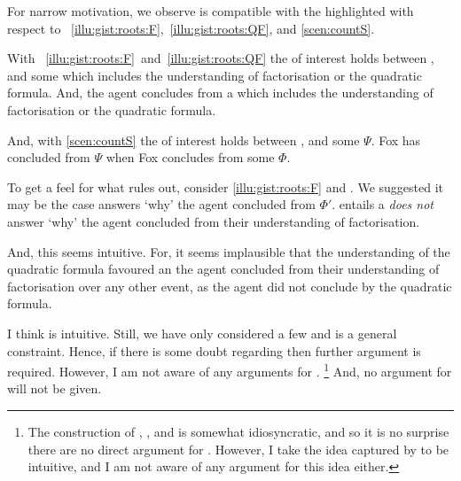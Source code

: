 \begin{note}
  For narrow motivation, we observe \issueInclusion{} is compatible with the  highlighted with respect to ~\ref{illu:gist:roots:F},~\ref{illu:gist:roots:QF}, and \ref{scen:countS}.

  With ~\ref{illu:gist:roots:F}~and~\ref{illu:gist:roots:QF} the \fofr{} of interest holds between \propM{\rootsCon{}},  and some \pool{} which includes the \agents{} understanding of factorisation or the quadratic formula.
  And, the agent concludes  from a \pool{} which includes the \agents{} understanding of factorisation or the quadratic formula.

  And, with \autoref{scen:countS} the \fofr{} of interest holds between \propI{\signConB{}},  and some \pool{} \(\Psi\).
  Fox has concluded  from \(\Psi\) when Fox concludes  from some \pool{} \(\Phi\).
\end{note}


\begin{note}
  To get a feel for what \issueInclusion{} rules out, consider \autoref{illu:gist:roots:F} and .
  We suggested it may be the case  answers `why' the agent concluded  from \(\Phi'\).
  \issueInclusion{} entails a  \emph{does not} answer `why' the agent concluded  from their understanding of factorisation.

  And, this seems intuitive.
  For, it seems implausible that the \agents{} understanding of the quadratic formula favoured an  the agent concluded  from their understanding of factorisation over any other event, as the agent did not conclude by the quadratic formula.
\end{note}


\begin{note}
  I think \issueInclusion{} is intuitive.
  Still, we have only considered a few  and \issueInclusion{} is a general constraint.
  Hence, if there is some doubt regarding \issueInclusion{} then further argument is required.
  However, I am not aware of any arguments for \issueInclusion{}.%
  \footnote{
    The construction of \qWhy{}, \qHow{}, and \issueInclusion{} is somewhat idiosyncratic, and so it is no surprise there are no direct argument for \issueInclusion{}.
    However, I take the idea captured by \issueInclusion{} to be intuitive, and I am not aware of any argument for this idea either.
  }
  And, no argument for \issueInclusion{} will not be given.
\end{note}



